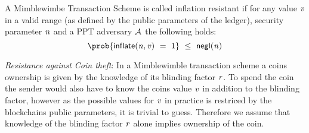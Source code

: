\begin{center}
\end{center}

\begin{definition} \label{def:atom:inflation-resistance}
    A Mimblewimbe Transaction Scheme is called inflation resistant if for any value $\mathit{v}$ in a valid range (as defined by the public parameters of the ledger), security
    parameter $\mathit{n}$ and a PPT adversary $\mathcal{A}$ the following holds:
    \[ \prob{\procInflate{\varN}{\varValue} \opEqNoQ 1} \opSmEq \funNegl{\varN} \]
\end{definition}

\emph{Resistance against Coin theft}: In a Mimblewimble transaction scheme a coins ownership is given by the knowledge of its blinding factor $\mathit{r}$. To spend the coin the sender would also have to know the coins value $\mathit{v}$ in addition
to the blinding factor, however as the possible values for $\mathit{v}$ in practice is restriced by the blockchains public parameters, it is trivial to guess.
Therefore we assume that knowledge of the blinding factor $\mathit{r}$ alone implies ownership of the coin.

